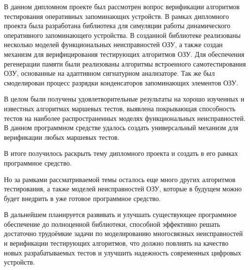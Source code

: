 
В данном дипломном проекте был рассмотрен вопрос верификации алгоритмов тестирования оперативных запоминающих устройств. В рамках дипломного проекта была разработана библиотека для симуляции работы динамического оперативного запоминающего устройства. В созданной библиотеке реализованы несколько моделей функциональных неисправностей ОЗУ, а также создан механизм для верифицирования тестирующих алгоритмов ОЗУ. Для обеспечения регенерации памяти были реализованы алгоритмы встроенного самотестирования ОЗУ, основанные на адаптивном сигнатурном анализаторе. Так же был смоделирован процесс разрядки конденсаторов запоминающих элементов ОЗУ.

В целом были получены удовлетворительные результаты на хорошо изученных и известных алгоритмах маршевых тестов, выявлена покрывающая способность тестов на наиболее распространенных моделях функциональных неисправностей. В данном программном средстве удалось создать универсальный механизм для верификации любых маршевых тестов.

В итоге получилось раскрыть тему дипломного проекта и создать в его рамках программное средство.

Но за рамками рассматриваемой темы осталось еще много других алгоритмов тестирования, а также моделей неисправностей ОЗУ, которые в будущем можно будет внедрить в уже готовое программное средство. 

В дальнейшем планируется развивать и улучшать существующее программное обеспечение до полноценной библиотеки, способной эффективно решать достаточно трудоёмкие задачи по моделированию многосвязных неисправностей и верификации тестирующих алгоритмов, что должно повлиять на качество новых разрабатываемых тестов и улучшить надежность современных цифровых устройств.



